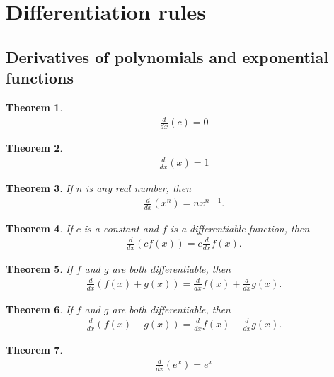 \documentclass{article}
\theoremstyle{sltheorem}
\newtheorem{theorem}{Theorem}[section]
\begin{document}
\section{Differentiation rules}
\subsection{Derivatives of polynomials and exponential functions}
\begin{theorem}
    \begin{align*}
        \frac{d}{dx}(c) = 0
    \end{align*}
\end{theorem}
\begin{theorem}
    \begin{align*}
        \frac{d}{dx}(x) = 1
    \end{align*}
\end{theorem}
\begin{theorem}
    If $n$ is any real number, then 
    \begin{align*}
        \frac{d}{dx}(x^n) = nx^{n-1}.
    \end{align*}
\end{theorem}
\begin{theorem}
    If $c$ is a constant and $f$ is a differentiable function, then
    \begin{align*}
        \frac{d}{dx}(cf(x))=c\frac{d}{dx}f(x).
    \end{align*}
\end{theorem}
\begin{theorem}
    If $f$ and $g$ are both differentiable, then
    \begin{align*}
        \frac{d}{dx}(f(x)+g(x))=\frac{d}{dx}f(x)+\frac{d}{dx}g(x).
    \end{align*}
\end{theorem}
\begin{theorem}
    If $f$ and $g$ are both differentiable, then
    \begin{align*}
        \frac{d}{dx}(f(x)-g(x))=\frac{d}{dx}f(x)-\frac{d}{dx}g(x).
    \end{align*}
\end{theorem}
\begin{theorem}
    \begin{align*}
        \frac{d}{dx}(e^x)=e^x
    \end{align*}
\end{theorem}
\end{document}
